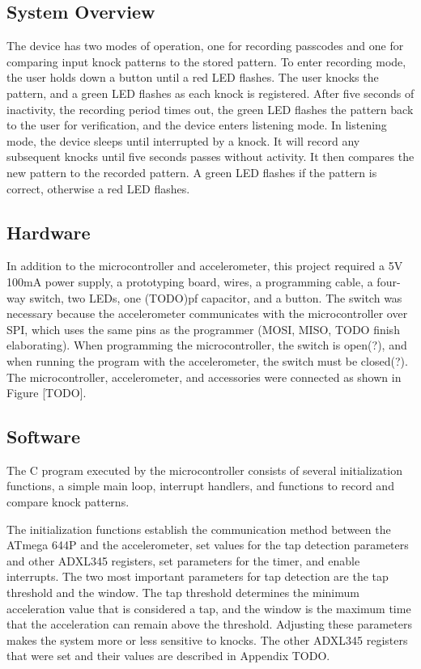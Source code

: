 \documentclass[conference]{./IEEEtran}
\begin{document}
\subsection{System Overview}
The device has two modes of operation, one for recording passcodes and one for comparing input knock patterns to the stored pattern. To enter recording mode, the user holds down a button until a red LED flashes. The user knocks the pattern, and a green LED flashes as each knock is registered. After five seconds of inactivity, the recording period times out, the green LED flashes the pattern back to the user for verification, and the device enters listening mode. In listening mode, the device sleeps until interrupted by a knock. It will record any subsequent knocks until five seconds passes without activity. It then compares the new pattern to the recorded pattern. A green LED flashes if the pattern is correct, otherwise a red LED flashes. 

\subsection{Hardware}
In addition to the microcontroller and accelerometer, this project required a 5V 100mA power supply, a prototyping board, wires, a programming cable, a four-way switch, two LEDs, one (TODO)pf capacitor, and a button. The switch was necessary because the accelerometer communicates with the microcontroller over SPI, which uses the same pins as the programmer (MOSI, MISO, TODO finish elaborating). When programming the microcontroller, the switch is open(?), and when running the program with the accelerometer, the switch must be closed(?). The microcontroller, accelerometer, and accessories were connected as shown in Figure [TODO].  

\subsection{Software}
The C program executed by the microcontroller consists of several initialization functions, a simple main loop, interrupt handlers, and functions to record and compare knock patterns.

The initialization functions establish the communication method between the ATmega 644P and the accelerometer, set values for the tap detection parameters and other ADXL345 registers, set parameters for the timer, and enable interrupts. The two most important parameters for tap detection are the tap threshold and the window. The tap threshold determines the minimum acceleration value that is considered a tap, and the window is the maximum time that the acceleration can remain above the threshold. Adjusting these parameters makes the system more or less sensitive to knocks. The other ADXL345 registers that were set and their values are described in Appendix TODO. 
\end{document}
